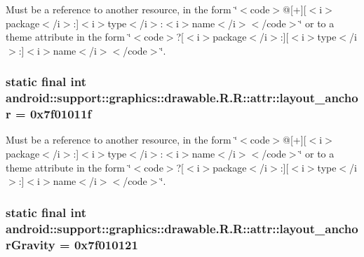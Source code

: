 Must be a reference to another resource, in the form \char`\"{}$<$code$>$@\mbox{[}+\mbox{]}\mbox{[}$<$i$>$package$<$/i$>$:\mbox{]}$<$i$>$type$<$/i$>$:$<$i$>$name$<$/i$>$$<$/code$>$\char`\"{} or to a theme attribute in the form \char`\"{}$<$code$>$?\mbox{[}$<$i$>$package$<$/i$>$:\mbox{]}\mbox{[}$<$i$>$type$<$/i$>$:\mbox{]}$<$i$>$name$<$/i$>$$<$/code$>$\char`\"{}. \hypertarget{classandroid_1_1support_1_1graphics_1_1drawable_1_1_r_1_1attr_80dbbfc9892175459cc20ac9f3128bea}{
\subsubsection[{layout\_\-anchor}]{\setlength{\rightskip}{0pt plus 5cm}static final int android::support::graphics::drawable.R.R::attr::layout\_\-anchor = 0x7f01011f}}
\label{classandroid_1_1support_1_1graphics_1_1drawable_1_1_r_1_1attr_80dbbfc9892175459cc20ac9f3128bea}


Must be a reference to another resource, in the form \char`\"{}$<$code$>$@\mbox{[}+\mbox{]}\mbox{[}$<$i$>$package$<$/i$>$:\mbox{]}$<$i$>$type$<$/i$>$:$<$i$>$name$<$/i$>$$<$/code$>$\char`\"{} or to a theme attribute in the form \char`\"{}$<$code$>$?\mbox{[}$<$i$>$package$<$/i$>$:\mbox{]}\mbox{[}$<$i$>$type$<$/i$>$:\mbox{]}$<$i$>$name$<$/i$>$$<$/code$>$\char`\"{}. \hypertarget{classandroid_1_1support_1_1graphics_1_1drawable_1_1_r_1_1attr_23768eee7b5011964e9f5b831d068d8a}{
\subsubsection[{layout\_\-anchorGravity}]{\setlength{\rightskip}{0pt plus 5cm}static final int android::support::graphics::drawable.R.R::attr::layout\_\-anchorGravity = 0x7f010121}}
\label{classandroid_1_1support_1_1graphics_1_1drawable_1_1_r_1_1attr_23768eee7b5011964e9f5b831d068d8a}


